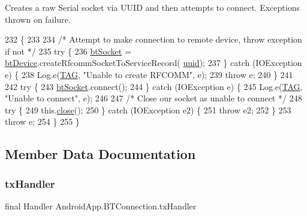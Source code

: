 Creates a raw Serial socket via U\+U\+ID and then attempts to connect. Exceptions thrown on failure. 
\begin{DoxyCode}
232                                               \{
233 
234         \textcolor{comment}{/* Attempt to make connection to remote device, throw exception if not */}
235         \textcolor{keywordflow}{try} \{
236             \hyperlink{class_android_app_1_1_b_t_connection_af3cdc6c880b28361d87d0118ace0e49c}{btSocket} = \hyperlink{class_android_app_1_1_b_t_connection_a3ed1e51b0f24f0b20ca5c27270f2999c}{btDevice}.createRfcommSocketToServiceRecord(
      \hyperlink{class_android_app_1_1_b_t_connection_a0e531d4cad0e5cca1e5b4446551b5c63}{uuid});
237         \} \textcolor{keywordflow}{catch} (IOException e) \{
238             Log.e(\hyperlink{class_android_app_1_1_b_t_connection_ad838024d59c68be866b5db329d6f6230}{TAG}, \textcolor{stringliteral}{"Unable to create RFCOMM"}, e);
239             \textcolor{keywordflow}{throw} e;
240         \}
241 
242         \textcolor{keywordflow}{try} \{
243             \hyperlink{class_android_app_1_1_b_t_connection_af3cdc6c880b28361d87d0118ace0e49c}{btSocket}.connect();
244         \} \textcolor{keywordflow}{catch} (IOException e) \{
245             Log.e(\hyperlink{class_android_app_1_1_b_t_connection_ad838024d59c68be866b5db329d6f6230}{TAG}, \textcolor{stringliteral}{"Unable to connect"}, e);
246 
247             \textcolor{comment}{/* Close our socket as unable to connect */}
248             \textcolor{keywordflow}{try} \{
249                 this.\hyperlink{class_android_app_1_1_b_t_connection_a37bb3e5c1dcf6b78a73239f6f62ab6d8}{close}();
250             \} \textcolor{keywordflow}{catch} (IOException e2) \{
251                 \textcolor{keywordflow}{throw} e2;
252             \}
253             \textcolor{keywordflow}{throw} e;
254         \}
255     \}
\end{DoxyCode}


\subsection{Member Data Documentation}
\mbox{\label{class_android_app_1_1_b_t_connection_a3236a74297d91f15dd63efc66f03a821}} 
\subsubsection{\texorpdfstring{tx\+Handler}{txHandler}}
{\footnotesize\ttfamily final Handler Android\+App.\+B\+T\+Connection.\+tx\+Handler}

